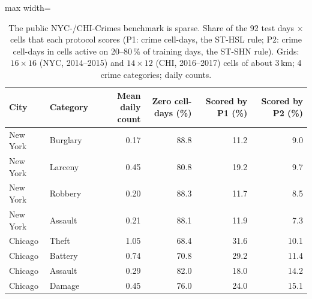 \begin{table}[!htbp]\centering\small
\caption{The public NYC-/CHI-Crimes benchmark is sparse. Share of the 92 test days $\times$ cells that each protocol scores (P1: crime cell-days, the ST-HSL rule; P2: crime cell-days in cells active on 20--80\,\% of training days, the ST-SHN rule). Grids: $16\times16$ (NYC, 2014--2015) and $14\times12$ (CHI, 2016--2017) cells of about 3\,km; 4 crime categories; daily counts.}\label{tab:sparsity}
\begin{adjustbox}{max width=\linewidth}\begin{tabular}{llrrrr}\toprule
City & Category & Mean daily count & Zero cell-days (\%) & Scored by P1 (\%) & Scored by P2 (\%)\\\midrule
New York & Burglary & 0.17 & 88.8 & 11.2 & 9.0 \\
New York & Larceny & 0.45 & 80.8 & 19.2 & 9.7 \\
New York & Robbery & 0.20 & 88.3 & 11.7 & 8.5 \\
New York & Assault & 0.21 & 88.1 & 11.9 & 7.3 \\
Chicago & Theft & 1.05 & 68.4 & 31.6 & 10.1 \\
Chicago & Battery & 0.74 & 70.8 & 29.2 & 11.4 \\
Chicago & Assault & 0.29 & 82.0 & 18.0 & 14.2 \\
Chicago & Damage & 0.45 & 76.0 & 24.0 & 15.1 \\
\bottomrule\end{tabular}\end{adjustbox}\end{table}
